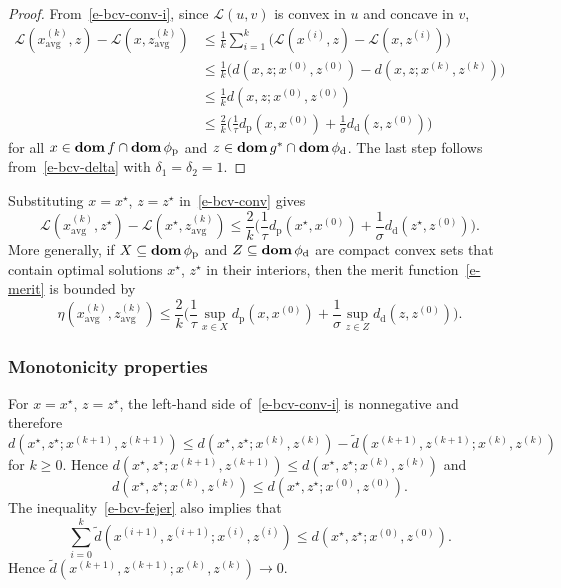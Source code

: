 \documentclass[letterpaper,11pt]{article}
\newcommand{\BEQ}{\begin{equation}}
\newcommand{\EEQ}{\end{equation}}
\newcommand{\dom}{\mathop{\bf dom}}
\newcommand{\avg}{\mathrm{avg}}
\newcommand{\primal}{\mathrm p}
\newcommand{\dual}{\mathrm d}
\newcommand{\cL}{\mathcal L}
\begin{document}
\begin{proof}
From~\eqref{e-bcv-conv-i},
since $\cL(u,v)$ is convex in $u$ and concave in $v$,
\begin{align*}
\cL(x^{(k)}_\avg, z) - \cL(x, z^{(k)}_\avg)
  &\leq \frac{1}{k} \sum_{i=1}^k
  \big(\cL(x^{(i)},z)-\cL(x,z^{(i)})\big) \nonumber \\
&\leq \frac{1}{k} \big(d(x,z;x^{(0)},z^{(0)})
  - d(x,z;x^{(k)},z^{(k)}) \big) \nonumber \\
&\leq \frac{1}{k} d(x,z;x^{(0)},z^{(0)}) \nonumber \\
&\leq \frac{2}{k} \Big(\frac{1}{\tau} d_\primal (x,x^{(0)})
  + \frac{1}{\sigma} d_\dual (z,z^{(0)}) \Big)
\end{align*}
for all $x \in \dom f \cap \dom \phi_\primal$
and $z \in \dom g^\ast \cap \dom \phi_\dual$.
The last step follows from~\eqref{e-bcv-delta} with $\delta_1=\delta_2=1$.
\end{proof}

Substituting $x=x^\star$, $z=z^\star$ in~\eqref{e-bcv-conv} gives
\[
\cL(x^{(k)}_\avg, z^\star)-\cL(x^\star, z^{(k)}_\avg)
\leq \frac{2}{k} \Big(\frac{1}{\tau} d_\primal (x^\star,x^{(0)})
  + \frac{1}{\sigma} d_\dual (z^\star,z^{(0)}) \Big).
\]
More generally, if $X \subseteq \dom \phi_\primal$ and
$Z \subseteq \dom \phi_\dual$ are compact convex sets
that contain optimal solutions $x^\star$, $z^\star$ in their interiors,
then the merit function~\eqref{e-merit} is bounded by
\[
\eta(x^{(k)}_\avg, z^{(k)}_\avg)
 \leq \frac{2}{k} 
  \Big(\frac{1}{\tau} \sup_{x \in X} d_\primal(x,x^{(0)})
   + \frac{1}{\sigma} \sup_{z \in Z} d_\dual(z,z^{(0)}) \Big).
\]

\subsubsection{Monotonicity properties} \label{s-fejer}

For $x=x^\star$, $z= z^\star$, 
the left-hand side of~\eqref{e-bcv-conv-i} is nonnegative and therefore
\BEQ
d(x^\star, z^\star; x^{(k+1)}, z^{(k+1)}) 
\leq d(x^\star, z^\star; x^{(k)}, z^{(k)})  
  -\tilde d(x^{(k+1)}, z^{(k+1)}; x^{(k)}, z^{(k)}) 
  \label{e-bcv-fejer}
\EEQ
for $k \geq 0$. Hence
$d(x^\star, z^\star; x^{(k+1)}, z^{(k+1)}) \leq
d(x^\star, z^\star; x^{(k)}, z^{(k)})$ and
\BEQ
d(x^\star, z^\star; x^{(k)}, z^{(k)})
\leq 
d(x^\star, z^\star; x^{(0)}, z^{(0)}). \label{e-bcv-bounded}
\EEQ
The inequality~\eqref{e-bcv-fejer} also implies that
\[
\sum_{i=0}^k \tilde d(x^{(i+1)}, z^{(i+1)}; x^{(i)}, z^{(i)})
\leq d(x^\star, z^\star; x^{(0)}, z^{(0)}).
\] 
Hence $\tilde d(x^{(k+1)}, z^{(k+1)}; x^{(k)}, z^{(k)}) \rightarrow 0$.
\end{document}
